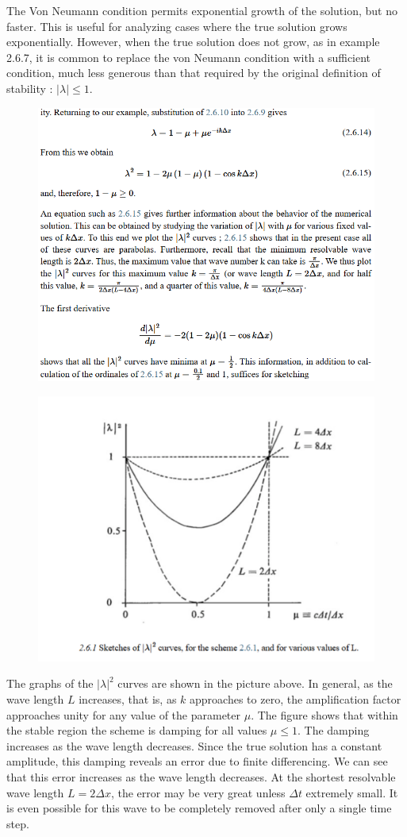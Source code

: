 The Von Neumann condition permits exponential growth of the solution, but no faster. This is useful for analyzing cases where the true solution grows exponentially. However, when the true solution does not grow, as in example 2.6.7, it is common to replace the von Neumann condition with a sufficient condition, much less generous than that required by the original definition of stability : \(|\lambda|\leq1\).
\begin{figure}[htp!]
    \centering
    \includegraphics[width=0.65\linewidth]{uploads/mi.png}
\end{figure}
\begin{figure}[htpb]
    \centering
    \includegraphics[width=0.45\linewidth]{uploads/pp.png}
\end{figure}

The graphs of the $|\lambda|^2$ curves are shown in the picture above. In general, as the wave length $L$ increases, that is, as $k$ approaches to zero, the amplification factor approaches unity for any value of the parameter $\mu$. The figure shows that within the stable region the scheme is damping for all values $\mu\leq 1$. The damping increases as the wave length decreases. Since the true solution has a constant amplitude, this damping reveals an error due to finite differencing. We can see that this error increases as the wave length decreases. At the shortest resolvable wave length $L=2\Delta x$, the error may be very great unless $\Delta t$ extremely small. It is even possible for this wave to be completely removed after only a single time step.


